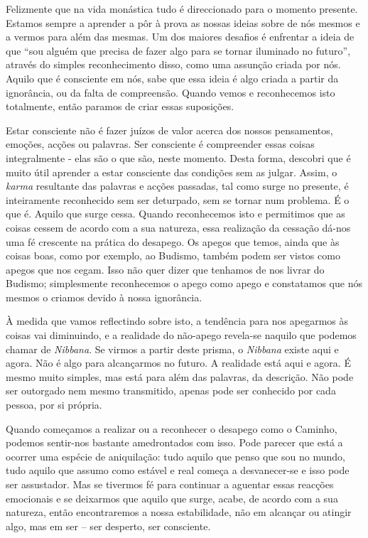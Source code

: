 Felizmente que na vida monástica tudo é direccionado para o momento
presente. Estamos sempre a aprender a pôr à prova as nossas ideias sobre
de nós mesmos e a vermos para além das mesmas. Um dos maiores desafios é
enfrentar a ideia de que ``sou alguém que precisa de fazer algo para se
tornar iluminado no futuro'', através do simples reconhecimento disso,
como uma assunção criada por nós. Aquilo que é consciente em nós, sabe
que essa ideia é algo criada a partir da ignorância, ou da falta de
compreensão. Quando vemos e reconhecemos isto totalmente, então paramos
de criar essas suposições.

Estar consciente não é fazer juízos de valor acerca dos nossos
pensamentos, emoções, acções ou palavras. Ser consciente é compreender
essas coisas integralmente - elas são o que são, neste momento. Desta
forma, descobri que é muito útil aprender a estar consciente das
condições sem as julgar. Assim, o \emph{karma} resultante das palavras e
acções passadas, tal como surge no presente, é inteiramente reconhecido
sem ser deturpado, sem se tornar num problema. É o que é. Aquilo que
surge cessa. Quando reconhecemos isto e permitimos que as coisas cessem
de acordo com a sua natureza, essa realização da cessação dá-nos uma fé
crescente na prática do desapego. Os apegos que temos, ainda que às
coisas boas, como por exemplo, ao Budismo, também podem ser vistos como
apegos que nos cegam. Isso não quer dizer que tenhamos de nos livrar do
Budismo; simplesmente reconhecemos o apego como apego e constatamos que
nós mesmos o criamos devido à nossa ignorância.

À medida que vamos reflectindo sobre isto, a tendência para nos
apegarmos às coisas vai diminuindo, e a realidade do não-apego revela-se
naquilo que podemos chamar de \emph{Nibbana}. Se virmos a partir deste
prisma, o \emph{Nibbana} existe aqui e agora. Não é algo para
alcançarmos no futuro. A realidade está aqui e agora. É mesmo muito
simples, mas está para além das palavras, da descrição. Não pode ser
outorgado nem mesmo transmitido, apenas pode ser conhecido por cada
pessoa, por si própria.

Quando começamos a realizar ou a reconhecer o desapego como o Caminho,
podemos sentir-nos bastante amedrontados com isso. Pode parecer que está
a ocorrer uma espécie de aniquilação: tudo aquilo que penso que sou no
mundo, tudo aquilo que assumo como estável e real começa a desvanecer-se
e isso pode ser assustador. Mas se tivermos fé para continuar a aguentar
essas reacções emocionais e se deixarmos que aquilo que surge, acabe, de
acordo com a sua natureza, então encontraremos a nossa estabilidade, não
em alcançar ou atingir algo, mas em ser -- ser desperto, ser consciente.

